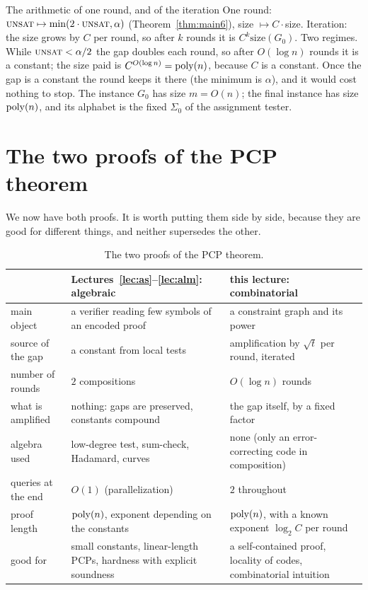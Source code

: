 \begin{bigpicture}{The arithmetic of one round, and of the iteration}
One round: $\textsc{unsat}\mapsto\min(2\cdot\textsc{unsat},\alpha)$ (Theorem~\ref{thm:main6}), size $\mapsto C\cdot$size.
Iteration: the size grows by $C$ per round, so after $k$ rounds it is $C^{k}\mathrm{size}(G_0)$.
Two regimes.  While $\textsc{unsat}<\alpha/2$ the gap doubles each round, so after $O(\log n)$ rounds it is a constant; the size paid is $C^{O(\log n)}=\operatorname{poly}(n)$, because $C$ is a constant.
Once the gap is a constant the round keeps it there (the minimum is $\alpha$), and it would cost nothing to stop.
The instance $G_0$ has size $m=O(n)$; the final instance has size $\operatorname{poly}(n)$, and its alphabet is the fixed $\Sigma_0$ of the assignment tester.
\end{bigpicture}


\section{The two proofs of the PCP theorem}
\label{sec:compare}

We now have both proofs.  It is worth putting them side by side, because they are good for different things, and neither supersedes the other.

\begin{table}[t]
\centering\small
\renewcommand{\arraystretch}{1.25}
\begin{tabular}{@{}l>{\raggedright\arraybackslash}p{5.0cm}>{\raggedright\arraybackslash}p{5.0cm}@{}}
\toprule
& Lectures~\ref{lec:as}--\ref{lec:alm}: algebraic & this lecture: combinatorial\\
\midrule
main object & a verifier reading few symbols of an encoded proof & a constraint graph and its power\\
source of the gap & a constant from local tests & amplification by $\sqrt t$ per round, iterated\\
number of rounds & $2$ compositions & $O(\log n)$ rounds\\
what is amplified & nothing: gaps are preserved, constants compound & the gap itself, by a fixed factor\\
algebra used & low-degree test, sum-check, Hadamard, curves & none (only an error-correcting code in composition)\\
queries at the end & $O(1)$ (parallelization) & $2$ throughout\\
proof length & $\operatorname{poly}(n)$, exponent depending on the constants & $\operatorname{poly}(n)$, with a known exponent $\log_2 C$ per round\\
good for & small constants, linear-length PCPs, hardness with explicit soundness & a self-contained proof, locality of codes, combinatorial intuition\\
\bottomrule
\end{tabular}
\caption{The two proofs of the PCP theorem.}
\label{tab:two-proofs}
\end{table}

